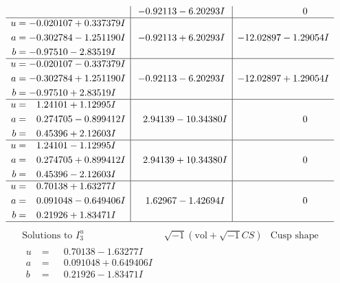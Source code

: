 \documentclass[1p]{elsarticle_modified}
\theoremstyle{definition}
\newcommand{\I}{\sqrt{-1}}
\begin{document}
$$\begin{array}{c|c|c}
 & -0.92113 - 6.20293 I & \phantom{-0.000000 } 0 \\ \hline\begin{aligned}
u &= -0.020107 + 0.337379 I \\
a &= -0.302784 - 1.251190 I \\
b &= -0.97510 - 2.83519 I\end{aligned}
 & -0.92113 + 6.20293 I & -12.02897 - 1.29054 I \\ \hline\begin{aligned}
u &= -0.020107 - 0.337379 I \\
a &= -0.302784 + 1.251190 I \\
b &= -0.97510 + 2.83519 I\end{aligned}
 & -0.92113 - 6.20293 I & -12.02897 + 1.29054 I \\ \hline\begin{aligned}
u &= \phantom{-}1.24101 + 1.12995 I \\
a &= \phantom{-}0.274705 - 0.899412 I \\
b &= \phantom{-}0.45396 + 2.12603 I\end{aligned}
 & \phantom{-}2.94139 - 10.34380 I & \phantom{-0.000000 } 0 \\ \hline\begin{aligned}
u &= \phantom{-}1.24101 - 1.12995 I \\
a &= \phantom{-}0.274705 + 0.899412 I \\
b &= \phantom{-}0.45396 - 2.12603 I\end{aligned}
 & \phantom{-}2.94139 + 10.34380 I & \phantom{-0.000000 } 0 \\ \hline\begin{aligned}
u &= \phantom{-}0.70138 + 1.63277 I \\
a &= \phantom{-}0.091048 - 0.649406 I \\
b &= \phantom{-}0.21926 + 1.83471 I\end{aligned}
 & \phantom{-}1.62967 - 1.42694 I & \phantom{-0.000000 } 0\\
 \hline 
 \end{array}$$\newpage$$\begin{array}{c|c|c}  
\text{Solutions to }I^u_{3}& \I (\text{vol} + \sqrt{-1}CS) & \text{Cusp shape}\\
 \hline 
\begin{aligned}
u &= \phantom{-}0.70138 - 1.63277 I \\
a &= \phantom{-}0.091048 + 0.649406 I \\
b &= \phantom{-}0.21926 - 1.83471 I\end{aligned}

\end{array}$$
\end{document}
